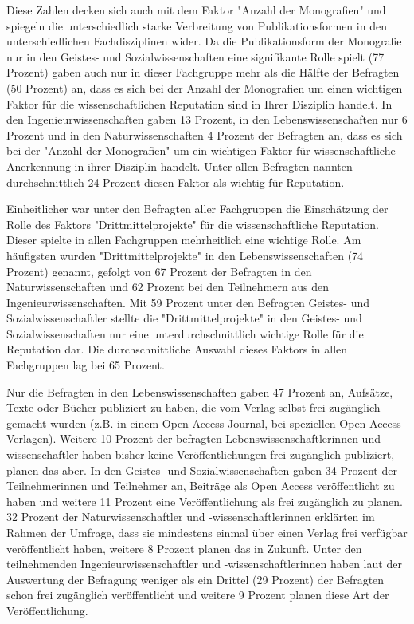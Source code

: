Diese Zahlen decken sich auch mit dem Faktor "Anzahl der Monografien" und spiegeln die unterschiedlich starke Verbreitung von Publikationsformen in den unterschiedlichen Fachdisziplinen wider. Da die Publikationsform der Monografie nur in den Geistes- und Sozialwissenschaften eine signifikante Rolle spielt (77 Prozent) gaben auch nur in dieser Fachgruppe mehr als die Hälfte der Befragten (50 Prozent) an, dass es sich bei der Anzahl der Monografien um einen wichtigen Faktor für die wissenschaftlichen Reputation sind in Ihrer Disziplin handelt. In den Ingenieurwissenschaften gaben 13 Prozent, in den Lebenswissenschaften nur 6 Prozent und in den Naturwissenschaften 4 Prozent der Befragten an, dass es sich bei der "Anzahl der Monografien" um ein wichtigen Faktor für wissenschaftliche Anerkennung in ihrer Disziplin handelt. Unter allen Befragten nannten durchschnittlich 24 Prozent diesen Faktor als wichtig für Reputation.

Einheitlicher war unter den Befragten aller Fachgruppen die Einschätzung der Rolle des Faktors "Drittmittelprojekte" für die wissenschaftliche Reputation. Dieser spielte in allen Fachgruppen mehrheitlich eine wichtige Rolle. Am häufigsten wurden "Drittmittelprojekte" in den Lebenswissenschaften (74 Prozent) genannt, gefolgt von 67 Prozent der Befragten in den Naturwissenschaften und 62 Prozent bei den Teilnehmern aus den Ingenieurwissenschaften. Mit 59 Prozent unter den Befragten Geistes- und Sozialwissenschaftler stellte die "Drittmittelprojekte" in den Geistes- und Sozialwissenschaften nur eine unterdurchschnittlich wichtige Rolle für die Reputation dar. Die durchschnittliche Auswahl dieses Faktors in allen Fachgruppen lag bei 65 Prozent.

Nur die Befragten in den Lebenswissenschaften gaben 47 Prozent an, Aufsätze, Texte oder Bücher publiziert zu haben, die vom Verlag selbst frei zugänglich gemacht wurden (z.B. in einem Open Access Journal, bei speziellen Open Access Verlagen). Weitere 10 Prozent der befragten Lebenswissenschaftlerinnen und -wissenschaftler haben bisher keine Veröffentlichungen frei zugänglich publiziert, planen das aber. In den Geistes- und Sozialwissenschaften gaben 34 Prozent der Teilnehmerinnen und Teilnehmer an, Beiträge als Open Access veröffentlicht zu haben und weitere 11 Prozent eine Veröffentlichung als frei zugänglich zu planen. 32 Prozent der Naturwissenschaftler und -wissenschaftlerinnen erklärten im Rahmen der Umfrage, dass sie mindestens einmal über einen Verlag frei verfügbar veröffentlicht haben, weitere 8 Prozent planen das in Zukunft. Unter den teilnehmenden Ingenieurwissenschaftler und -wissenschaftlerinnen haben laut der Auswertung der Befragung weniger als ein Drittel (29 Prozent) der Befragten schon frei zugänglich veröffentlicht und weitere 9 Prozent planen diese Art der Veröffentlichung.

